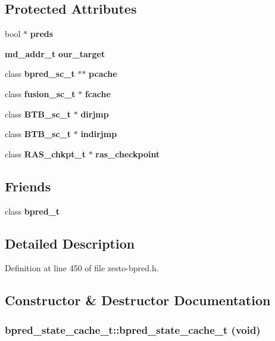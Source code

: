 \subsection*{Protected Attributes}
\begin{CompactItemize}
\item 
bool $\ast$ {\bf preds}
\item 
{\bf md\_\-addr\_\-t} {\bf our\_\-target}
\item 
class {\bf bpred\_\-sc\_\-t} $\ast$$\ast$ {\bf pcache}
\item 
class {\bf fusion\_\-sc\_\-t} $\ast$ {\bf fcache}
\item 
class {\bf BTB\_\-sc\_\-t} $\ast$ {\bf dirjmp}
\item 
class {\bf BTB\_\-sc\_\-t} $\ast$ {\bf indirjmp}
\item 
class {\bf RAS\_\-chkpt\_\-t} $\ast$ {\bf ras\_\-checkpoint}
\end{CompactItemize}
\subsection*{Friends}
\begin{CompactItemize}
\item 
class {\bf bpred\_\-t}
\end{CompactItemize}


\subsection{Detailed Description}


Definition at line 450 of file zesto-bpred.h.

\subsection{Constructor \& Destructor Documentation}
\subsubsection[{bpred\_\-state\_\-cache\_\-t}]{\setlength{\rightskip}{0pt plus 5cm}bpred\_\-state\_\-cache\_\-t::bpred\_\-state\_\-cache\_\-t (void)\hspace{0.3cm}{\tt  [inline]}}\label{classbpred__state__cache__t_52dc7d033f4f1c95aa44029fc9d40629}




